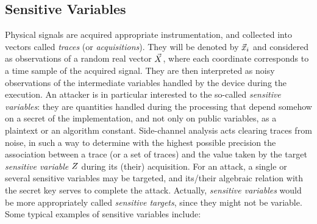 \subsection{Sensitive Variables}\label{sec:sensitive_variables}
Physical signals are acquired \via appropriate instrumentation, and collected into vectors called \emph{traces} (or \emph{acquisitions}). They will be denoted by $\vec{x}_i$ and considered as observations of a random real vector $\vec{X}$, where each coordinate corresponds to a time sample of the acquired signal.  They are then interpreted as noisy observations of the intermediate variables handled by the device during the execution. An attacker is in particular interested to the so-called \emph{sensitive variables}:  they are quantities handled during the processing that depend somehow on a secret of the implementation, and not only on public variables, as a plaintext or an algorithm constant. Side-channel analysis acts clearing traces from noise, in such a way to determine with the highest possible precision the association between a trace (or a set of traces) and the value taken by the target \emph{sensitive variable} $Z$ during its (their) acquisition. For an attack, a single or several sensitive variables may be targeted, and its/their algebraic relation with the secret key serves to complete the attack.  Actually, \emph{sensitive variables} would be more appropriately called \emph{sensitive targets}, since they might not be variable. Some typical examples of sensitive variables include: 


